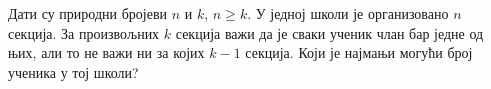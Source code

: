 Дати су природни бројеви $n$ и $k$, $n \geq k$.
У једној школи је организовано $n$ секција.
За произвољних $k$ секција важи да је сваки ученик члан бар једне од њих, али
то не важи ни за којих $k-1$ секција.
Који је најмањи могући број ученика у тој школи?

\solution


